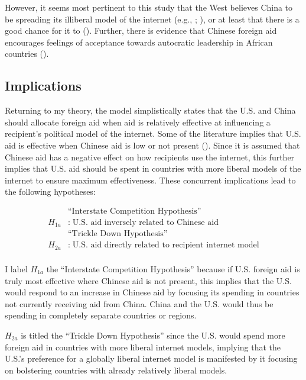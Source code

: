\documentclass[12pt]{article}
\begin{document}
However, it seems most pertinent to this study that the West believes China to be spreading its illiberal model of the internet (e.g., \cite{hillman2021}; \cite{u.s.departmentofstate2022}), or at least that there is a good chance for it to (\cite{triolo2020}). Further, there is evidence that Chinese foreign aid encourages feelings of acceptance towards autocratic leadership in African countries (\cite{gehring2022}).

\subsection*{Implications}
Returning to my theory, the model simplistically states that the U.S. and China should allocate foreign aid when aid is relatively effective at influencing a recipient's political model of the internet. Some of the literature implies that U.S. aid is effective when Chinese aid is low or not present (\cite{dreher2021}). Since it is assumed that Chinese aid has a negative effect on how recipients use the internet, this further implies that U.S. aid should be spent in countries with more liberal models of the internet to ensure maximum effectiveness. These concurrent implications lead to the following hypotheses:

\begin{align*}
    &\text{``Interstate Competition Hypothesis''}\\
    H_{1a}&:\;\text{U.S. aid inversely related to Chinese aid}\\
    &\text{``Trickle Down Hypothesis''}\\
    H_{2a}&:\;\text{U.S. aid directly related to recipient internet model}\\
\end{align*}

I label $H_{1a}$ the ``Interstate Competition Hypothesis'' because if U.S. foreign aid is truly most effective where Chinese aid is not present, this implies that the U.S. would respond to an increase in Chinese aid by focusing its spending in countries not currently receiving aid from China. China and the U.S. would thus be spending in completely separate countries or regions.

$H_{2a}$ is titled the ``Trickle Down Hypothesis'' since the U.S. would spend more foreign aid in countries with more liberal internet models, implying that the U.S.'s preference for a globally liberal internet model is manifested by it focusing on bolstering countries with already relatively liberal models.
\end{document}
